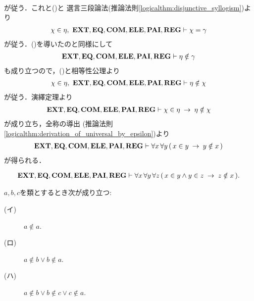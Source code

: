 \begin{sketch}
\begin{align}
		\end{align}
		が従う．これと()と
		選言三段論法(推論法則\ref{logicalthm:disjunctive_syllogism})より
		\begin{align}
			\chi \in \eta,\ \mbox{{\bf EXT}},\mbox{{\bf EQ}},\mbox{\bf COM},\mbox{{\bf ELE}},\mbox{{\bf PAI}},\mbox{{\bf REG}} \vdash 
			\chi = \gamma
			\label{fom:no_pair_of_sets_go_round_9}
		\end{align}
		が従う．()を導いたのと同様にして
		\begin{align}
			\mbox{{\bf EXT}},\mbox{{\bf EQ}},\mbox{\bf COM},\mbox{{\bf ELE}},\mbox{{\bf PAI}},\mbox{{\bf REG}} \vdash \eta \notin \gamma
		\end{align}
		も成り立つので，()と相等性公理より
		\begin{align}
			\chi \in \eta,\ \mbox{{\bf EXT}},\mbox{{\bf EQ}},\mbox{\bf COM},\mbox{{\bf ELE}},\mbox{{\bf PAI}},\mbox{{\bf REG}} \vdash 
			\eta \notin \chi
		\end{align}
		が従う．演繹定理より
		\begin{align}
			\mbox{{\bf EXT}},\mbox{{\bf EQ}},\mbox{\bf COM},\mbox{{\bf ELE}},\mbox{{\bf PAI}},\mbox{{\bf REG}} \vdash 
			\chi \in \eta \hspace{0.25em}\rightarrow\hspace{0.25em} \eta \notin \chi
		\end{align}
		が成り立ち，全称の導出
		(推論法則\ref{logicalthm:derivation_of_universal_by_epsilon})より
		\begin{align}
			\mbox{{\bf EXT}},\mbox{{\bf EQ}},\mbox{\bf COM},\mbox{{\bf ELE}},\mbox{{\bf PAI}},\mbox{{\bf REG}} \vdash 
			\forall x\, \forall y\, (\, x \in y \hspace{0.25em}\rightarrow\hspace{0.25em} y \notin x\, )
		\end{align}
		が得られる．
		\QED
	\end{sketch}
	
	\begin{screen}
		\begin{thm}[集合のどの三組も所属関係で堂々巡りしない]
		\label{thm:no_three_sets_go_round}
			\begin{align}
				\mbox{{\bf EXT}},\mbox{{\bf EQ}},\mbox{\bf COM},\mbox{{\bf ELE}},\mbox{{\bf PAI}},\mbox{{\bf REG}} \vdash 
				\forall x\, \forall y\, \forall z\, 
				(\, x \in y \wedge y \in z \hspace{0.25em}\rightarrow\hspace{0.25em} z \notin x\, ).
			\end{align}
		\end{thm}
	\end{screen}
	
	\begin{screen}
		\begin{thm}[いかなる類も自分自身を要素に持たない]
		\label{thm:no_set_is_an_element_of_itself}
			$a,b,c$を類とするとき次が成り立つ:
			\begin{description}
				\item[(イ)] $a \notin a$.
				
				\item[(ロ)] $a \notin b \vee b \notin a$.
				
				\item[(ハ)] $a \notin b \vee b \notin c \vee c \notin a$.
			\end{description}
		\end{thm}
	\end{screen}
	
